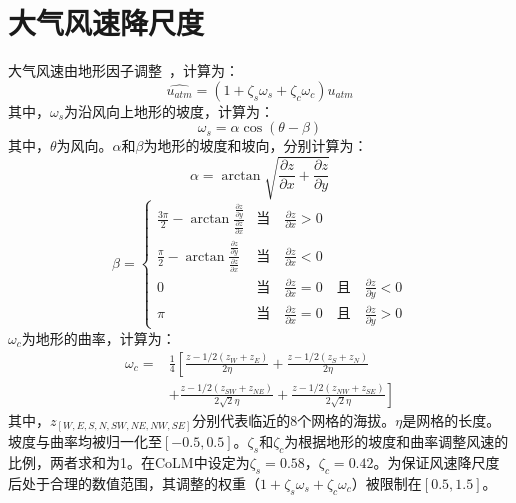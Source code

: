 \section{大气风速降尺度}\label{大气风速降尺度}
大气风速由地形因子调整~\citep{liston2006Meteorological}，计算为：
\begin{equation}
\hat{u_{a t m}}=\left(1+\zeta_{s}\omega_{s}+\zeta_{c}\omega_{c}\right)u_{atm}
\end{equation}
其中，$\omega_{s}$为沿风向上地形的坡度，计算为：
\begin{equation}
\omega_{s}=\alpha \cos{\left(\theta-\beta\right)}
\end{equation}
其中，$\theta$为风向。$\alpha$和$\beta$为地形的坡度和坡向，分别计算为：
\begin{equation}
\alpha=\arctan \sqrt{\frac{\partial z}{\partial x}+\frac{\partial z}{\partial y}}
\end{equation}
%
\begin{equation}
\beta=\begin{cases}
    \frac{3\pi}{2}-\arctan \frac{\frac{\partial z}{\partial y}}{\frac{\partial z}{\partial x}} & \text{当}\quad \frac{\partial z}{\partial x}>0 \\
    \frac{\pi}{2}-\arctan \frac{\frac{\partial z}{\partial y}}{\frac{\partial z}{\partial x}} & \text{当}\quad \frac{\partial z}{\partial x}<0 \\
    0 & \text{当}\quad \frac{\partial z}{\partial x}=0\quad \text{且}\quad \frac{\partial z}{\partial y}<0 \\
    \pi & \text{当}\quad \frac{\partial z}{\partial x}=0\quad \text{且}\quad \frac{\partial z}{\partial y}>0 
\end{cases}
\end{equation}
$\omega_{c}$为地形的曲率，计算为：
\begin{equation}
   \begin{split}
    \omega_{c}=&\frac{1}{4}\left[\frac{z-1/2\left(z_{W}+z_{E}\right)}{2\eta}+\frac{z-1/2\left(z_{S}+z_{N}\right)}{2\eta}\right. \\
    & \left.+\frac{z-1/2\left(z_{SW}+z_{NE}\right)}{2\sqrt{2}\eta}+\frac{z-1/2\left(z_{NW}+z_{SE}\right)}{2\sqrt{2}\eta}\right]
   \end{split}
\end{equation}
其中，$z_{[W,E,S,N,SW,NE,NW,SE]}$分别代表临近的8个网格的海拔。$\eta$是网格的长度。坡度与曲率均被归一化至$[-0.5,0.5]$。$\zeta_{s}$和$\zeta_{c}$为根据地形的坡度和曲率调整风速的比例，两者求和为1。在CoLM中设定为$\zeta_{s}=0.58$，$\zeta_{c}=0.42$。为保证风速降尺度后处于合理的数值范围，其调整的权重（$1+\zeta_{s}\omega_{s}+\zeta_{c}\omega_{c}$）被限制在$[0.5,1.5]$。

